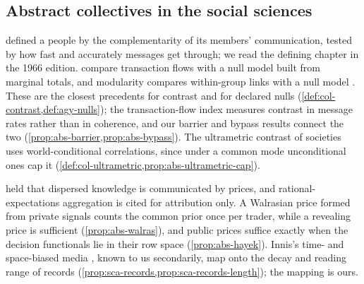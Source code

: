 \subsection{Abstract collectives in the social sciences}\label{sec:rel-social}

\citet{deutsch1953nationalism} defined a people by the complementarity of its members' communication, tested by how fast and accurately messages get through; we read the defining chapter in the 1966 edition. \citet{savage1960statistical} compare transaction flows with a null model built from marginal totals, and modularity compares within-group links with a null model \citep{newman2006modularity}. These are the closest precedents for contrast and for declared nulls (\cref{def:col-contrast,def:agy-nulls}); the transaction-flow index measures contrast in message rates rather than in coherence, and our barrier and bypass results connect the two (\cref{prop:abs-barrier,prop:abs-bypass}). The ultrametric contrast of societies uses world-conditional correlations, since under a common mode unconditional ones cap it (\cref{def:col-ultrametric,prop:abs-ultrametric-cap}).

\citet{hayek1945use} held that dispersed knowledge is communicated by prices, and rational-expectations aggregation \citep{grossman1976efficiency,hellwig1980aggregation,grossman1980impossibility} is cited for attribution only. A Walrasian price formed from private signals counts the common prior once per trader, while a revealing price is sufficient (\cref{prop:abs-walras}), and public prices suffice exactly when the decision functionals lie in their row space (\cref{prop:abs-hayek}). Innis's time- and space-biased media \citep{innis1950empire}, known to us secondarily, map onto the decay and reading range of records (\cref{prop:sca-records,prop:sca-records-length}); the mapping is ours.

